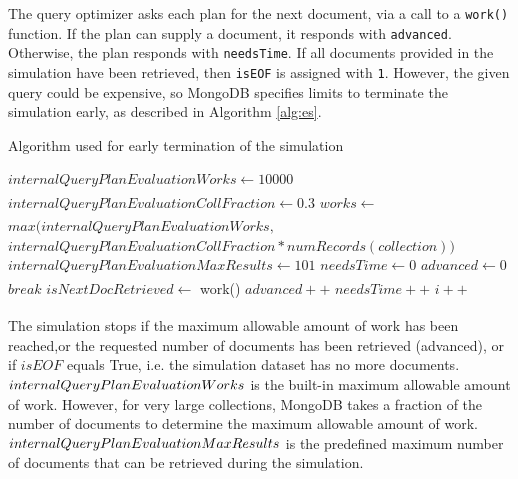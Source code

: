 The query optimizer asks each plan for the next document, via
a call to a \verb|work()| function. If the plan can supply a document, it
responds with \verb|advanced|. Otherwise, the plan responds 
with \verb|needsTime|. If all documents provided in the 
simulation have been retrieved, then \verb|isEOF| is assigned 
with \verb|1|.
However, the given query could be expensive, so MongoDB specifies
limits to terminate the simulation early, as described in Algorithm \ref{alg:es}.

    
\begin{algorithm}
    \caption{Algorithm used for early termination of the simulation}
    \begin{algorithmic}
        \STATE $internalQueryPlanEvaluationWorks \xleftarrow[]{} 10000$ 
        \STATE $internalQueryPlanEvaluationCollFraction \xleftarrow[]{} 0.3$
        \STATE $works \xleftarrow[]{} $ $max(internalQueryPlanEvaluationWorks,$
        \STATE $internalQueryPlanEvaluationCollFraction * numRecords(collection))$
        \STATE $internalQueryPlanEvaluationMaxResults \xleftarrow[]{} 101$ 
        \STATE $needsTime \xleftarrow[]{} 0$
        \STATE $advanced \xleftarrow[]{} 0$
        \STATE
                \STATE $break$
            \ENDIF
            \STATE $isNextDocRetrieved \xleftarrow[]{}$ work()
                \STATE $advanced++$
            \ELSE{}
                \STATE $needsTime++$
            \ENDIF
            \STATE $i++$
        \ENDWHILE
    \end{algorithmic}
    \label{alg:es}
\end{algorithm}

The simulation stops if the maximum allowable amount of work has been 
reached,or the requested number of documents has been retrieved 
(advanced), or if $isEOF$ equals True, i.e. the simulation dataset has
no more documents. $internal\-Query\-Plan\-Evaluation\-Works$ is the 
built-in maximum allowable amount of work. However, for very large collections,
MongoDB takes a fraction of the number of documents to determine the 
maximum allowable amount of work. $internal\-Query\-Plan\-Evaluation\-Max\-Results$ is the predefined maximum number of documents that can be retrieved during the simulation.

